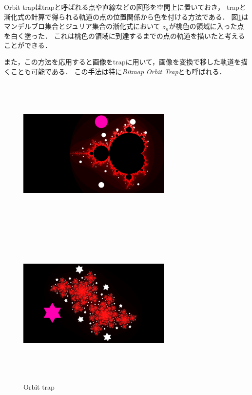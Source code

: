 Orbit trapはtrapと呼ばれる点や直線などの図形を空間上に置いておき，
trapと漸化式の計算で得られる軌道の点の位置関係から色を付ける方法である．
図\ref{fig:orbitTrap}はマンデルブロ集合とジュリア集合の漸化式において
$z_n$が桃色の領域に入った点を白く塗った．
これは桃色の領域に到達するまでの点の軌道を描いたと考えることができる．

また，この方法を応用すると画像をtrapに用いて，画像を変換で移した軌道を描
くことも可能である．
この手法は特に\textit{Bitmap Orbit Trap}とも呼ばれる．

\begin{figure}[htbp]
 \begin{minipage}{0.49\hsize}
  \center
  \includegraphics[width=3in, height=3in, keepaspectratio]{../img/fractal/mandelbrot-orbit.pdf}
  \label{}
 \end{minipage}
 \begin{minipage}{0.49\hsize}
  \center
  \includegraphics[width=3in, height=3in,
   keepaspectratio]{../img/fractal/juliaOrbit.pdf}
  \label{}
 \end{minipage}
 \caption{Orbit trap}
 \label{fig:orbitTrap}
\end{figure}

